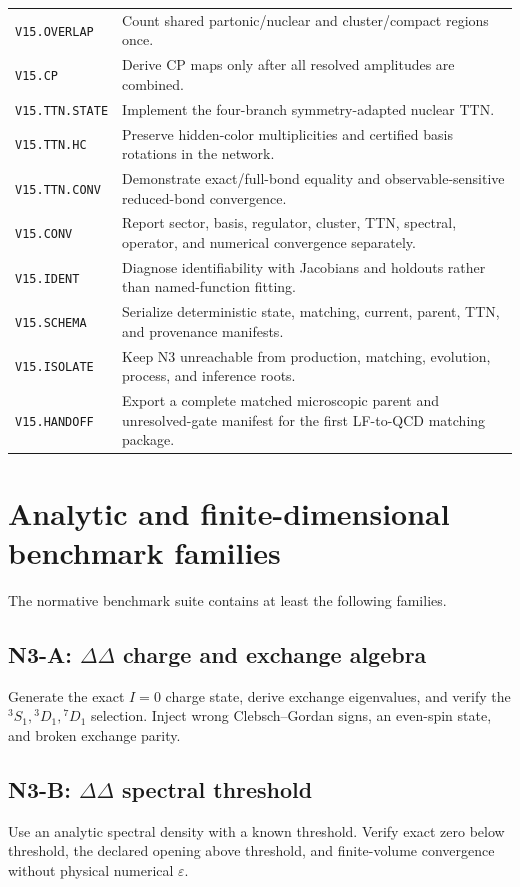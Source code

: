 \documentclass[11pt]{article}
\newcommand{\eps}{\varepsilon}
\begin{document}
{\begin{longtable}{L{0.23\textwidth}L{0.69\textwidth}}
\texttt{V15.OVERLAP} & Count shared partonic/nuclear and cluster/compact regions once. \\
\texttt{V15.CP} & Derive CP maps only after all resolved amplitudes are combined. \\
\texttt{V15.TTN.STATE} & Implement the four-branch symmetry-adapted nuclear TTN. \\
\texttt{V15.TTN.HC} & Preserve hidden-color multiplicities and certified basis rotations in the network. \\
\texttt{V15.TTN.CONV} & Demonstrate exact/full-bond equality and observable-sensitive reduced-bond convergence. \\
\texttt{V15.CONV} & Report sector, basis, regulator, cluster, TTN, spectral, operator, and numerical convergence separately. \\
\texttt{V15.IDENT} & Diagnose identifiability with Jacobians and holdouts rather than named-function fitting. \\
\texttt{V15.SCHEMA} & Serialize deterministic state, matching, current, parent, TTN, and provenance manifests. \\
\texttt{V15.ISOLATE} & Keep N3 unreachable from production, matching, evolution, process, and inference roots. \\
\texttt{V15.HANDOFF} & Export a complete matched microscopic parent and unresolved-gate manifest for the first LF-to-QCD matching package. \\
\bottomrule
\end{longtable}
}

\section{Analytic and finite-dimensional benchmark families}
\label{sec:benchmarks}

The normative benchmark suite contains at least the following families.

\subsection*{N3-A: \(\Delta\Delta\) charge and exchange algebra}
Generate the exact \(I=0\) charge state, derive exchange eigenvalues, and verify the \({}^3S_1,{}^3D_1,{}^7D_1\) selection.  Inject wrong Clebsch--Gordan signs, an even-spin state, and broken exchange parity.

\subsection*{N3-B: \(\Delta\Delta\) spectral threshold}
Use an analytic spectral density with a known threshold.  Verify exact zero below threshold, the declared opening above threshold, and finite-volume convergence without physical numerical \(\eps\).
\end{document}
